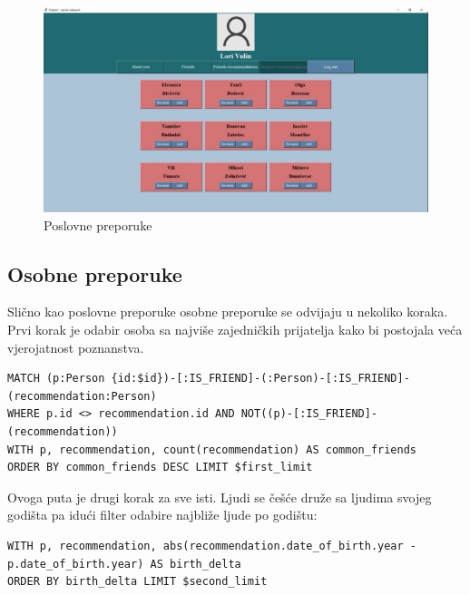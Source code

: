 \documentclass[titlepage, 12pt]{scrartcl}
\begin{document}
\begin{figure}[h]
    \centering
    \includegraphics[scale=0.19]{slike/business.jpg}
    \caption{Poslovne preporuke}
    \label{fig:business_rec}
\end{figure}

\subsection{Osobne preporuke}
Slično kao poslovne preporuke osobne preporuke se odvijaju u nekoliko koraka. \\
Prvi korak je odabir osoba sa najviše zajedničkih prijatelja kako bi postojala veća vjerojatnost poznanstva.
\begin{samepage}
\begin{verbatim}
MATCH (p:Person {id:$id})-[:IS_FRIEND]-(:Person)-[:IS_FRIEND]-(recommendation:Person)
WHERE p.id <> recommendation.id AND NOT((p)-[:IS_FRIEND]-(recommendation))
WITH p, recommendation, count(recommendation) AS common_friends
ORDER BY common_friends DESC LIMIT $first_limit

\end{verbatim}
\end{samepage}
Ovoga puta je drugi korak za sve isti. Ljudi se češće druže sa ljudima svojeg godišta pa idući filter odabire najbliže ljude po godištu:
\begin{samepage}
\begin{verbatim}
WITH p, recommendation, abs(recommendation.date_of_birth.year - p.date_of_birth.year) AS birth_delta 
ORDER BY birth_delta LIMIT $second_limit

\end{verbatim}
\end{samepage}
\end{document}
